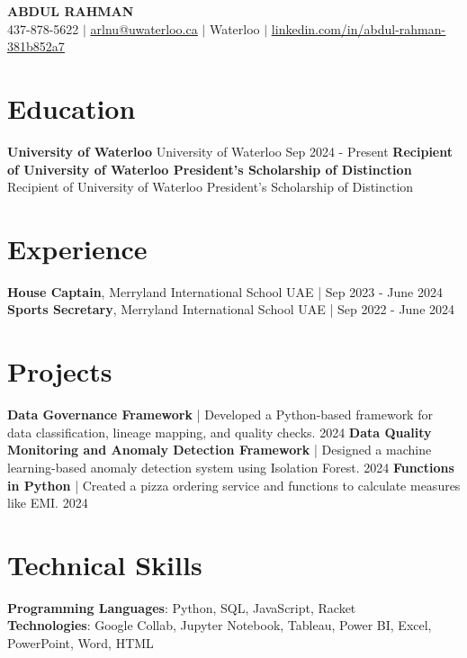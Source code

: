 \documentclass[letterpaper,11pt]{article}
\newcommand{\resumeSubHeadingListStart}{\begin{itemize}[leftmargin=0.15in, label={}]}
\newcommand{\resumeSubHeadingListEnd}{\end{itemize}}
\begin{document}
\begin{center}
    \textbf{\Huge \scshape ABDUL RAHMAN} \\ \vspace{1pt}
    \small 437-878-5622 $|$ \href{mailto:arlnu@uwaterloo.ca}{\underline{arlnu@uwaterloo.ca}} $|$ Waterloo $|$
    \href{https://www.linkedin.com/in/abdul-rahman-381b852a7}{\underline{linkedin.com/in/abdul-rahman-381b852a7}}
\end{center}

\section{Education}
\resumeSubHeadingListStart
\textbf{University of Waterloo} \hfill University of Waterloo
\textit{} \hfill Sep 2024 - Present
\textbf{Recipient of University of Waterloo President’s Scholarship of Distinction} \hfill Recipient of University of Waterloo President’s Scholarship of Distinction
\textit{}
\resumeSubHeadingListEnd

\section{Experience}
\resumeSubHeadingListStart
\textbf{House Captain}, Merryland International School \hfill UAE | Sep 2023 - June 2024
\textbf{Sports Secretary}, Merryland International School \hfill UAE | Sep 2022 - June 2024
\resumeSubHeadingListEnd

\section{Projects}
\resumeSubHeadingListStart
\textbf{Data Governance Framework} | Developed a Python-based framework for data classification, lineage mapping, and quality checks. \hfill 2024
\textbf{Data Quality Monitoring and Anomaly Detection Framework} | Designed a machine learning-based anomaly detection system using Isolation Forest. \hfill 2024
\textbf{Functions in Python} | Created a pizza ordering service and functions to calculate measures like EMI. \hfill 2024
\resumeSubHeadingListEnd

\section{Technical Skills}
\resumeSubHeadingListStart
\textbf{Programming Languages}: Python, SQL, JavaScript, Racket\\
\textbf{Technologies}: Google Collab, Jupyter Notebook, Tableau, Power BI, Excel, PowerPoint, Word, HTML
\resumeSubHeadingListEnd
\end{document}

